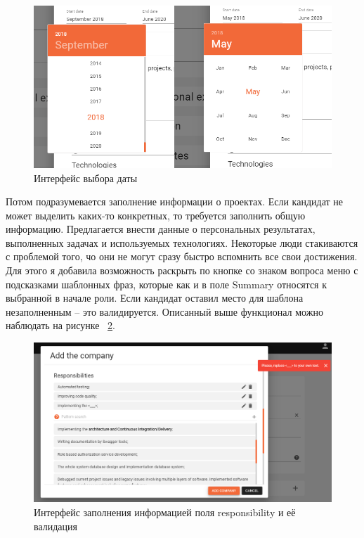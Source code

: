 \documentclass[a4paper,12pt]{diplom}
\begin{document}
\begin{figure}[!ht]
	\centering
	\includegraphics[width=1\textwidth]{resources/dates.png}
	\caption{Интерфейс выбора даты}
	\label{10}
\end{figure}

Потом подразумевается заполнение информации о проектах. Если кандидат не может выделить каких-то конкретных, то требуется заполнить общую информацию. Предлагается внести данные о персональных результатах, выполненных задачах и используемых технологиях.
Некоторые люди стакиваются с проблемой того, чо они не могут сразу быстро вспомнить все свои достижения.
Для этого я добавила возможность раскрыть по кнопке со знаком вопроса меню с подсказками шаблонных фраз, которые как и в поле Summary относятся к выбранной в начале роли. Если кандидат оставил место для шаблона незаполненным -- это валидируется.
Описанный выше функционал можно наблюдать на рисунке ~\ref{11}.

\begin{figure}[!ht]
	\centering
	\includegraphics[width=1\textwidth]{resources/responsibility.png}
	\caption{Интерфейс заполнения информацией поля responsibility и её валидация}
	\label{11}
\end{figure}
\end{document}
